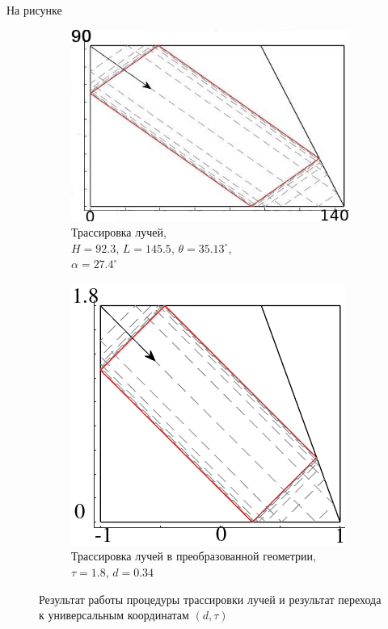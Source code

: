 На рисунке 

\begin{figure}
    \begin{subfigure}[с]{0.45\textwidth}
        \centering
        \includegraphics[scale=0.45]{Figs/RayTr923x1455.jpeg}
        \caption{Трассировка лучей,\\ $H=92.3$, $L=145.5$, $\theta = 35.13^{\circ}$,\\ $\alpha = 27.4^{\circ}$}
    \end{subfigure}
    \begin{subfigure}[r]{0.45\textwidth}
        \centering
        \includegraphics[scale=0.45]{Figs/RTdtau.png}
        \caption{Трассировка лучей в преобразованной геометрии, \\ $\tau = 1.8$, $d = 0.34$}
    \end{subfigure}
    
    
    \caption{Результат работы процедуры трассировки лучей и результат перехода к универсальным координатам $(d,\tau)$}


    \label{fig:RayTr923x1455}
\end{figure}
